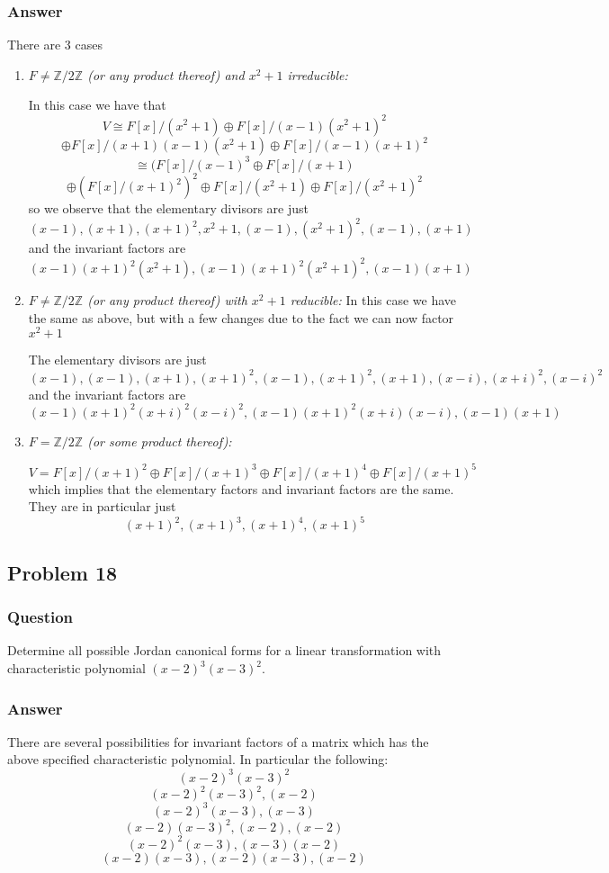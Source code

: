 \documentclass[12pt]{article}
\begin{document}
\subsubsection{Answer}
There are 3 cases 
\begin{enumerate}


\item \emph{$F  \neq \mathbb{Z}/2\mathbb{Z}$ (or any product thereof) and $x^2+1$ irreducible:}

In this case we have that 
\[V \cong F[x]/(x^2+1)\oplus F[x]/(x-1)(x^2+1)^2\]
\[ \oplus F[x]/(x+1)(x-1)(x^2+1)\oplus F[x] / (x-1)(x+1)^2 \]
\[\cong (F[x] /(x-1)^3 \oplus F[x]/(x+1)\]
\[ \oplus (F[x]/(x+1)^2)^2 \oplus F[x]/(x^2+1) \oplus F[x]/(x^2+1)^2\]
so we observe that the elementary divisors are just 
\[(x-1),(x+1), (x+1)^2, x^2+1, (x-1),  (x^2+1)^2, (x-1), (x+1)\]
and the invariant factors are
\[ (x-1)(x+1)^2(x^2+1), (x-1)(x+1)^2(x^2+1)^2, (x-1)(x+1)\]

\item \emph{$F  \neq \mathbb{Z}/2\mathbb{Z}$ (or any product thereof)  with $x^2+1$  reducible:}
In this case we have the same as above, but with a few changes due to the fact we can now factor $x^2+1$

The elementary divisors are just 
\[(x-1), (x-1),(x+1), (x+1)^2, (x-1), (x+1)^2,  (x+1), (x-i), (x+i)^2, (x-i)^2 \]
and the invariant factors are
\[ (x-1)(x+1)^2(x+i)^2(x-i)^2, (x-1)(x+1)^2(x+i)(x-i), (x-1)(x+1)\]



\item \emph{$F  = \mathbb{Z}/2\mathbb{Z}$ (or some product thereof):} 

\[V=F[x]/(x+1)^2 \oplus F[x]/(x+1)^3\oplus F[x]/(x+1)^4\oplus F[x]/(x+1)^5\]
which implies that the elementary factors and invariant factors are the same. They are in particular just 
\[(x+1)^2, (x+1)^3, (x+1)^4, (x+1)^5\]
\end{enumerate}

\subsection{Problem 18}

\subsubsection{Question}
Determine all possible Jordan canonical forms for a linear transformation with characteristic polynomial $(x-2)^3(x-3)^2$.
\subsubsection{Answer}
There are several possibilities for invariant factors of a matrix which has the above specified characteristic polynomial. In particular the following:
\[ (x-2)^3(x-3)^2\]\[(x-2)^2(x-3)^2,(x-2) \]\[(x-2)^3(x-3),(x-3)\]\[(x-2)(x-3)^2,(x-2),(x-2) \]\[ (x-2)^2(x-3),(x-3)(x-2)\]\[(x-2)(x-3),(x-2)(x-3),(x-2) \]
\end{document}

